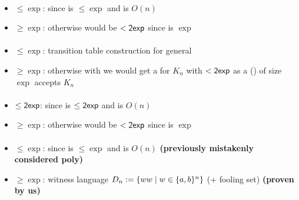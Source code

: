 \paragraph{\OMOLA{}\tto\TNFA}
\begin{itemize}
	\item $\le\exp$: since \hyperref[cost:OM1LAto1NFA]{\OMOLA{}\tto\ONFA} is $\le\exp$ and \ONFA{}\tto\TNFA is $O(n)$
	\item $\ge\exp$: otherwise \hyperref[cost:OM1LAto1DFA]{\OMOLA{}\tto\ODFA} would be $<\mathsf{2exp}$ since \hyperref[cost:2NFAto1DFA]{\TNFA{}\tto\ODFA} is $\exp$
\end{itemize}
\paragraph{\OMODLA{}\tto\ODFA}\label{cost:OM1DLAto1DFA}
\begin{itemize}
	\item $\le\exp$: transition table construction for general \OLA \cite{PigPis14}
	\item $\ge\exp$: otherwise with \hyperref[cost:OM1DLAto1DFA]{\OMODLA{}\tto\ODFA} we would get a \ODFA for $K_n$ with $<\mathsf{2exp}$ as a \OMODLA (\TDFA) of size $\exp$ accepts $K_n$
\end{itemize}
\paragraph{\OMOLA{}\tto\OMODLA}
\begin{itemize}
	\item $\le\mathsf{2exp}$: since \hyperref[cost:OM1LAto1DFA]{\OMOLA{}\tto\ODFA} is $\le\mathsf{2exp}$ and \ODFA{}\tto\OMODLA is $O(n)$
	\item $\ge\exp$: otherwise \hyperref[cost:OM1LAto1DFA]{\OMOLA{}\tto\ODFA} would be $<\mathsf{2exp}$ since \hyperref[cost:OM1DLAto1DFA]{\OMODLA{}\tto\ODFA} is $\exp$
\end{itemize}
\paragraph{\OMODLA{}\tto\ONFA}
\begin{itemize}
	\item $\le\exp$: since \hyperref[cost:OM1DLAto1DFA]{\OMODLA{}\tto\ODFA} is $\le\exp$ and \ODFA{}\tto\ONFA is $O(n)$ \textbf{(previously mistakenly considered poly)}
	\item $\ge\exp$: witness language $D_n:=\{ww\mid w\in\{a,b\}^n\}$ (\OMODLA + fooling set) \textbf{(proven by us)}
\end{itemize}
